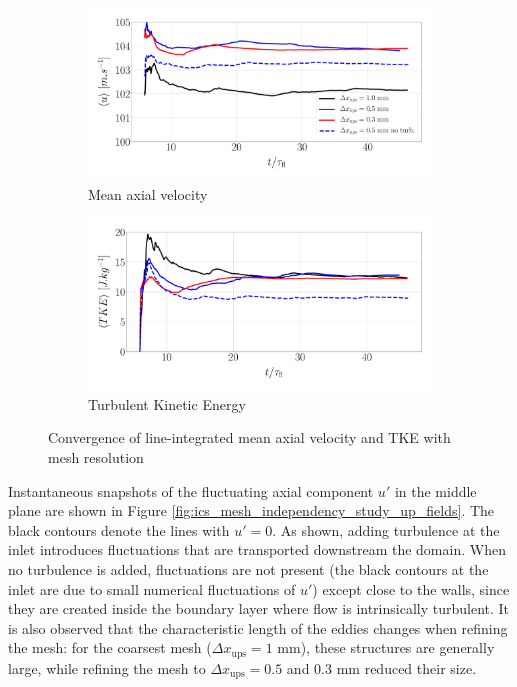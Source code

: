 \begin{figure}[ht]
\centering
\begin{subfigure}[b]{0.45\textwidth}
	\centering
   \includegraphics[scale=0.125]{./part2_developments/figures_ch5_resolved_JICF/results_ics_mesh_convergence_line_averages/U_MEAN.pdf}
   \caption{Mean axial velocity}
\end{subfigure}
\hfill
\begin{subfigure}[b]{0.45\textwidth}
	\centering
   \includegraphics[scale=0.125]{./part2_developments/figures_ch5_resolved_JICF/results_ics_mesh_convergence_line_averages/TKE.pdf}
   \caption{Turbulent Kinetic Energy}
\end{subfigure}
\caption{Convergence of line-integrated mean axial velocity and TKE with mesh resolution}
\label{fig:mesh_convergence_line_averages}
\end{figure}



Instantaneous snapshots of the fluctuating axial component $u'$ in the middle plane are shown in Figure \ref{fig:ics_mesh_independency_study_up_fields}. The black contours denote the lines with $u' = 0$. As shown, adding turbulence at the inlet introduces fluctuations that are transported downstream the domain. When no turbulence is added, fluctuations are not present (the black contours at the inlet are due to small numerical fluctuations of $u'$) except close to the walls, since they are created inside the boundary layer where flow is intrinsically turbulent. It is also observed that the characteristic length of the eddies changes when refining the mesh: for the coarsest mesh ($\Delta x_\mathrm{ups} = 1$ mm), these structures are generally large, while refining the mesh to $\Delta x_\mathrm{ups} = 0.5$ and $0.3$ mm reduced their size. 

